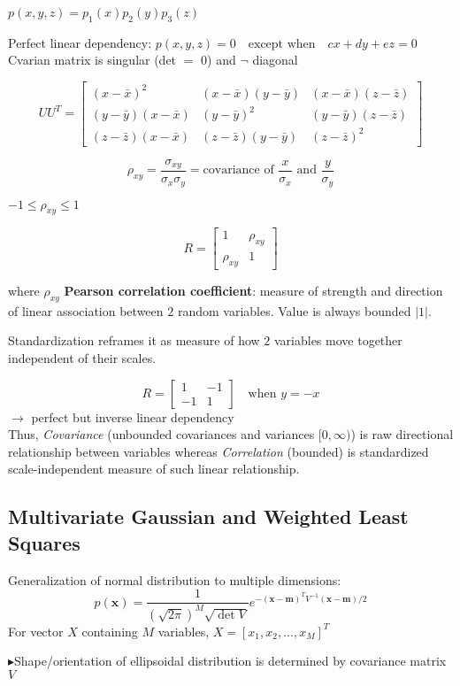 \documentclass[../Main.tex]{subfiles}
\begin{document}
$p(x, y, z) = p_1(x) p_2(y) p_3(z)$

Perfect linear dependency: $p(x, y, z) = 0 \quad \text{except when} \quad cx + dy + ez = 0$ Cvarian matrix is singular (det $=$ $0$) and $\neg$ diagonal

\[
UU^T = 
\begin{bmatrix} (x-\bar{x})^2 & (x-\bar{x})(y-\bar{y}) & (x-\bar{x})(z-\bar{z}) \\ (y-\bar{y})(x-\bar{x}) & (y-\bar{y})^2 & (y-\bar{y})(z-\bar{z}) \\ (z-\bar{z})(x-\bar{x}) & (z-\bar{z})(y-\bar{y}) & (z-\bar{z})^2 \end{bmatrix}
\]

\[
\rho_{xy} = \frac{\sigma_{xy}}{\sigma_x \sigma_y} = \text{covariance of } \frac{x}{\sigma_x} \text{ and } \frac{y}{\sigma_y} 
\]

\begin{center}
    $-1 \le \rho_{xy} \le 1$    
\end{center}


\[
R = \begin{bmatrix} 1 & \rho_{xy} \\ \rho_{xy} & 1 \end{bmatrix} 
\]

where $\rho_{xy}$ \textbf{Pearson correlation coefficient}: measure of strength and direction of linear association between $2$ random variables. Value is always bounded $|1|$.

Standardization reframes it as measure of how $2$ variables move together independent of their scales.

\[
R = \begin{bmatrix} 1 & -1 \\ -1 & 1 \end{bmatrix} \quad \text{when } y = -x
\] $\rightarrow$ perfect but inverse linear dependency\\

Thus, \textit{Covariance} (unbounded covariances and variances $[0, \infty)$) is raw directional relationship between variables whereas \textit{Correlation} (bounded) is standardized scale-independent measure of such linear relationship.

\subsection{Multivariate Gaussian and Weighted Least Squares}

Generalization of normal distribution to multiple dimensions:
\[
p(\mathbf{x}) = \frac{1}{(\sqrt{2\pi})^M \sqrt{\det V}} e^{-(\mathbf{x}-\mathbf{m})^T V^{-1} (\mathbf{x}-\mathbf{m})/2}
\]
For vector $X$ containing $M$ variables, $X=[x_1,x_2,...,x_M]^T$

$\blacktriangleright$Shape/orientation of ellipsoidal distribution is determined by covariance matrix $V$
\end{document}
